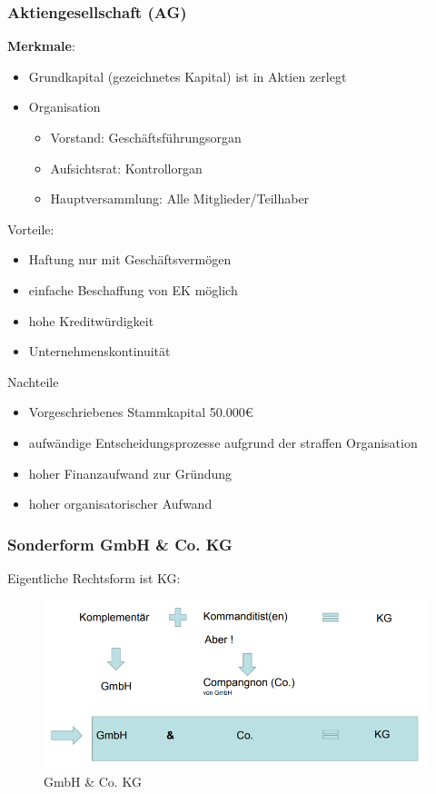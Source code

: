 \documentclass[]{article}
\begin{document}
\subsubsection{Aktiengesellschaft (AG)}
\textbf{Merkmale}: 
\begin{itemize}
	\item Grundkapital (gezeichnetes Kapital) ist in Aktien zerlegt
	\item Organisation
	\begin{itemize}
		\item Vorstand: Geschäftsführungsorgan
		\item Aufsichtsrat: Kontrollorgan
		\item Hauptversammlung: Alle Mitglieder/Teilhaber
	\end{itemize}
\end{itemize}

\begin{minipage}[t]{0.45\textwidth}
	Vorteile:
	\begin{itemize}
		\item Haftung nur mit Geschäftsvermögen
		\item einfache Beschaffung von EK möglich
		\item hohe Kreditwürdigkeit
		\item Unternehmenskontinuität 
	\end{itemize}
\end{minipage}
\hfill
\begin{minipage}[t]{0.45\textwidth}
	Nachteile
	\begin{itemize}
		\item Vorgeschriebenes Stammkapital 50.000€
		\item aufwändige Entscheidungsprozesse aufgrund der straffen Organisation
		\item hoher Finanzaufwand zur Gründung
		\item hoher organisatorischer Aufwand
	\end{itemize}
\end{minipage}

\newpage
\subsubsection{Sonderform GmbH \& Co. KG}
Eigentliche Rechtsform ist KG:

\begin{figure}[h!]
	\centering
	\includegraphics[width=0.7\linewidth]{"assetes/GmbH und Co KG"}
	\caption{GmbH \& Co. KG}
	\label{fig:rechtsformen---gmbh_cokg}
\end{figure}
\end{document}
